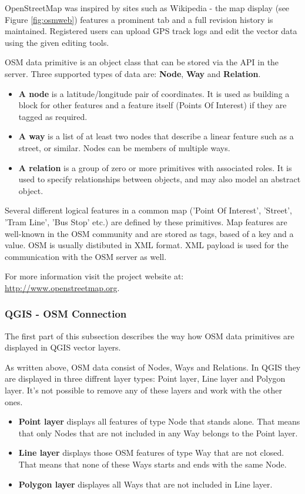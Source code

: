 OpenStreetMap was inspired by sites such as Wikipedia - the map display 
(see Figure \ref{fig:osmweb}) features a prominent  tab and a 
full revision history is maintained. Registered users can upload GPS track 
logs and edit the vector data using the given editing tools.

OSM data primitive is an object class that can be stored via the API in the
server. Three supported types of data are: \textbf{Node}, \textbf{Way} and 
\textbf{Relation}. 

\begin{itemize}
\item \textbf{A node} is a latitude/longitude pair of coordinates. It is 
used as building a block for other features and a feature itself (Points Of 
Interest) if they are tagged as required. 
\item \textbf{A way} is a list of at least two nodes that describe a linear
feature such as a street, or similar. Nodes can be members of multiple ways.
\item \textbf{A relation} is a group of zero or more primitives with 
associated roles. It is used to specify relationships between objects, 
and may also model an abstract object. 
\end{itemize}

Several different logical features in a common map ('Point Of Interest',
'Street', 'Tram Line', 'Bus Stop' etc.) are defined by these primitives. 
Map features are well-known in the OSM community and are stored as tags, 
based of a key and a value. OSM is usually distibuted in XML format. XML 
payload is used for the communication with the OSM server as well.

For more information visit the project website at:
\url{http://www.openstreetmap.org}.

\subsubsection{QGIS - OSM Connection}\label{qgis-osm-connection}

The first part of this subsection describes the way how OSM data primitives 
are displayed in QGIS vector layers.

As written above, OSM data consist of Nodes, Ways and Relations. In QGIS they 
are displayed in three diffrent layer types: Point layer, Line layer and 
Polygon layer. It's not possible to remove any of these layers and work with 
the other ones.

\begin{itemize}
\item \textbf{Point layer} displays all features of type Node that stands 
alone. That means that only Nodes that are not included in any Way belongs 
to the Point layer.
\item \textbf{Line layer} displays those OSM features of type Way that are 
not closed. That means that none of these Ways starts and ends with the 
same Node.
\item \textbf{Polygon layer} displayes all Ways that are not included in 
Line layer.
\end{itemize}


